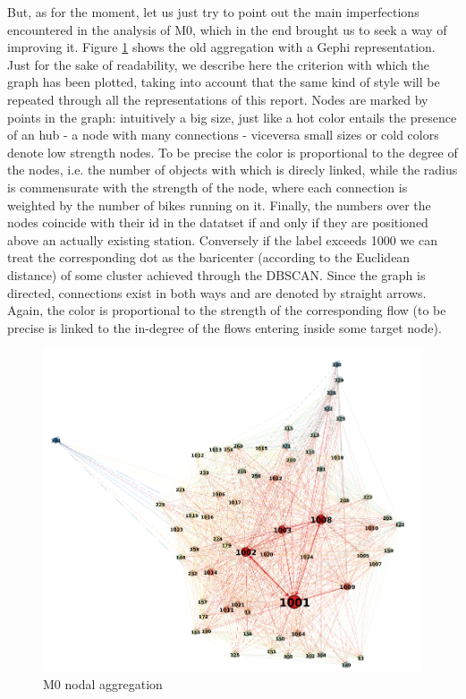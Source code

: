 \documentclass[11pt,twoside]{report}
\begin{document}
But, as for the moment, let us just try to point out the main imperfections encountered in the analysis of M0, which in the end brought us to seek a way of improving it. Figure \ref{fig:old_model_gephi} shows the old aggregation with a Gephi representation. Just for the sake of readability, we describe here the criterion with which the graph has been plotted, taking into account that the same kind of style will be repeated through all the representations of this report. Nodes are marked by points in the graph: intuitively a big size, just like a hot color entails the presence of an hub - a node with many connections - viceversa small sizes or cold colors denote low strength nodes. To be precise the color is proportional to the degree of the nodes, i.e. the number of objects with which is direcly linked, while the radius is commensurate with the strength of the node, where each connection is weighted by the number of bikes running on it. Finally, the numbers over the nodes coincide with their id in the datatset if and only if they are positioned above an actually existing station. Conversely if the label exceeds 1000 we can treat the corresponding dot as the baricenter (according to the Euclidean distance) of some cluster achieved through the DBSCAN. Since the graph is directed, connections exist in both ways and are denoted by straight arrows. Again, the color is proportional to the strength of the corresponding flow (to be precise is linked to the in-degree of the flows entering inside some target node).

\begin{figure}[H]
	\begin{center}
		\includegraphics[width=15cm]{./pictures/old_model_gephi.png}
	\end{center}
	\caption{M0 nodal aggregation}
	\label{fig:old_model_gephi}
\end{figure}
\end{document}
